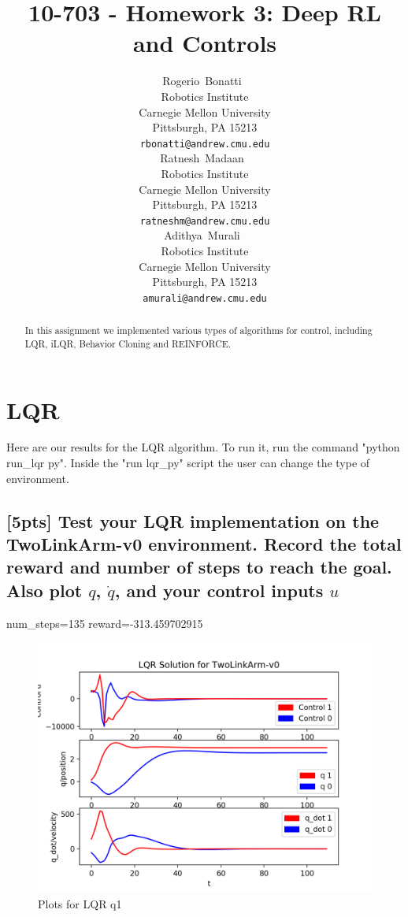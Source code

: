\documentclass{article}
\title{10-703 - Homework 3: Deep RL and Controls}
\author{
  Rogerio~Bonatti\ \\
  Robotics Institute\\
  Carnegie Mellon University\\
  Pittsburgh, PA 15213 \\
  \texttt{rbonatti@andrew.cmu.edu} \\
  \And
  Ratnesh~Madaan\ \\
  Robotics Institute\\
  Carnegie Mellon University\\
  Pittsburgh, PA 15213 \\
  \texttt{ratneshm@andrew.cmu.edu} \\
  \And
  Adithya~Murali\ \\
  Robotics Institute\\
  Carnegie Mellon University\\
  Pittsburgh, PA 15213 \\
  \texttt{amurali@andrew.cmu.edu} \\
}
\begin{document}

\maketitle

\begin{abstract}
  In this assignment we implemented various types of algorithms for control, including LQR, iLQR, Behavior Cloning and REINFORCE. 
\end{abstract}

\section{LQR}
Here are our results for the LQR algorithm. To run it, run the command "python run\_lqr py". Inside the "run lqr\_py" script the user can change the type of environment.

\subsection{[5pts] Test your LQR implementation on the TwoLinkArm-v0 environment. Record the total reward and number of steps to reach the goal. Also plot $q$, $\dot{q}$, and your control inputs $u$}

num\_steps=135
reward=-313.459702915

\begin{figure}[H] \label{fig:lqr_qn1}
  \centering
  \includegraphics[width=1.2\textwidth]{images/lqr_qn1}
  \caption{Plots for LQR q1}
\end{figure}
\end{document}
